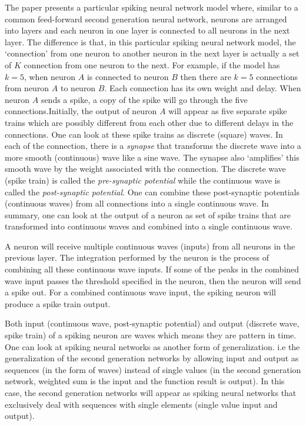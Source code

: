 \documentclass[12pt,A4]{article}
\begin{document}
The paper presents a particular spiking neural network model where, similar to a common 
feed-forward second generation neural network, neurons are arranged into layers and each neuron
in one layer is connected to all neurons in the next layer. The difference is that, in this 
particular spiking neural network model, the `connection' from one neuron to another neuron in the
next layer is actually a set of $K$ connection from one neuron to the next. For example, if the model
has $k=5$, when neuron $A$ is connected to neuron $B$ then there are $k=5$ connections from neuron 
$A$ to neuron $B$. Each connection has its own weight and delay. When neuron $A$ sends a spike, 
a copy of the spike will go through the five connections.Initially, the output of neuron $A$ will
appear as five separate spike trains which are possibly different from each other due to different
delays in the connections. One can look at these spike trains as discrete (square) waves. In each
of the connection, there is a \emph{synapse} that transforms the discrete wave into a more smooth
(continuous) wave like a sine wave. The synapse also `amplifies' this smooth wave by the weight 
associated with the connection. The discrete wave (spike train) is called the \emph{pre-synaptic 
potential} while the continuous wave is called the \emph{post-synaptic potential}. One can combine
these post-synaptic potentials (continuous waves) from all connections into a single continuous wave. 
In summary, one can look at the output of a neuron as set of spike trains that are transformed 
into continuous waves and combined into a single continuous wave.

A neuron will receive multiple continuous waves (inputs) from all neurons in the previous layer. The
integration performed by the neuron is the process of combining all these continuous wave inputs. 
If some of the peaks in the combined wave input passes the threshold specified in the neuron, then
the neuron will send a spike out. For a combined continuous wave input, the spiking neuron will 
produce a spike train output.

Both input (continuous wave, post-synaptic potential) and output (discrete wave, spike train) of a
spiking neuron are waves which means they are pattern in time. One can look at spiking neural 
networks as another form of generalization. i.e the generalization of the second generation 
networks by allowing input and output as sequences (in the form of waves) instead of single values
(in the second generation network, weighted sum is the input and the function result is output). In
this case, the second generation networks will appear as spiking neural networks that exclusively
deal with sequences with single elements (single value input and output).
\end{document}
